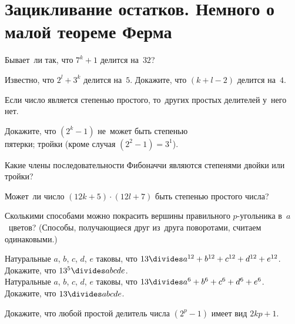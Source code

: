 

\section*{Зацикливание остатков. Немного о малой теореме Ферма}


\begin{problems}

Бывает~ли так, что $7^k + 1$ делится на~$32$?

\item
Известно, что $2^l + 3^k$ делится на~$5$.
Докажите, что $(k + l - 2)$ делится на~$4$.

\end{problems}

Если число является степенью простого, то~других простых делителей у~него нет.

\begin{problems}

\item
Докажите, что $(2^k - 1)$ не~может быть степенью
\\
\subproblem пятерки;
\quad
\subproblem тройки (кроме случая $(2^2 - 1) = 3^1$).

\item
Какие члены последовательности Фибоначчи являются степенями двойки или тройки?

\item
Может~ли число $(12 k + 5) \cdot (12 l + 7)$ быть степенью простого числа?

\item{}
Сколькими способами можно покрасить вершины правильного $p$-угольника
в~$a$~цветов?
(Способы, получающиеся друг из~друга поворотами, считаем одинаковыми.)

\item
\subproblem
Натуральные $a$, $b$, $c$, $d$, $e$ таковы, что
\(
    13 \divides a^{12} + b^{12} + c^{12} + d^{12} + e^{12}
\).\\
Докажите, что $13^5 \divides a b c d e$.
\\
\subproblem
Натуральные $a$, $b$, $c$, $d$, $e$ таковы, что
\(
    13 \divides a^{6} + b^{6} + c^{6} + d^{6} + e^{6}
\).\\
Докажите, что $13 \divides a b c d e$.

\item
Докажите, что любой простой делитель числа $(2^p - 1)$ имеет вид $2 k p + 1$.

\end{problems}

